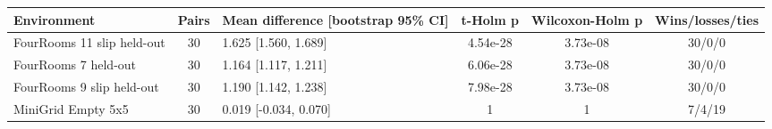 \begin{tabular}{lclccc}
\toprule
Environment & Pairs & Mean difference [bootstrap 95\% CI] & t-Holm p & Wilcoxon-Holm p & Wins/losses/ties \\
\midrule
FourRooms 11 slip held-out & 30 & 1.625 [1.560, 1.689] & 4.54e-28 & 3.73e-08 & 30/0/0 \\
FourRooms 7 held-out & 30 & 1.164 [1.117, 1.211] & 6.06e-28 & 3.73e-08 & 30/0/0 \\
FourRooms 9 slip held-out & 30 & 1.190 [1.142, 1.238] & 7.98e-28 & 3.73e-08 & 30/0/0 \\
MiniGrid Empty 5x5 & 30 & 0.019 [-0.034, 0.070] & 1 & 1 & 7/4/19 \\
\bottomrule
\end{tabular}
